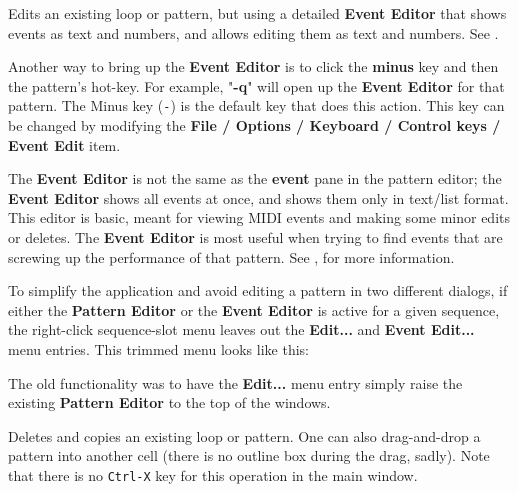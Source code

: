    Edits an existing loop or pattern, but using a detailed \textbf{Event Editor}
   that shows events as text and numbers, and allows editing them as text and
   numbers.
   See .

   Another way to bring up the \textbf{Event Editor} is to
   click the \textbf{minus} key and then the pattern's hot-key.
   For example, "\textbf{-q}" will open up the \textbf{Event Editor}
   for that pattern.
   The Minus key (\texttt{-}) is the default key that does this action.
   This key can be changed by modifying the
   \textbf{File / Options / Keyboard / Control keys / Event Edit} item.

   The \textbf{Event Editor}
   is not the same as the \textbf{event} pane in the pattern
   editor; the \textbf{Event Editor} shows all events at once, and shows them
   only in text/list format.  This editor is basic, meant for viewing
   MIDI events and making some minor edits or deletes.
   The \textbf{Event Editor} is most useful when trying to find events
   that are screwing up the performance of that pattern.
   See , for more information.

   To simplify the application and avoid editing a pattern in
   two different dialogs, if either the 
   \textbf{Pattern Editor} or the
   \textbf{Event Editor} is
   active for a given sequence, the right-click sequence-slot menu leaves out
   the \textbf{Edit...} and \textbf{Event Edit...} menu entries.
   This trimmed menu looks like this:


   The old functionality was to have the \textbf{Edit...} menu entry simply
   raise the existing 
   \textbf{Pattern Editor} to the top of the windows.

   Deletes and copies an existing loop or pattern.
   One can also drag-and-drop a pattern into another cell (there is no outline
   box during the drag, sadly).
   Note that there is no \texttt{Ctrl-X} key for this operation in the
   main window.


